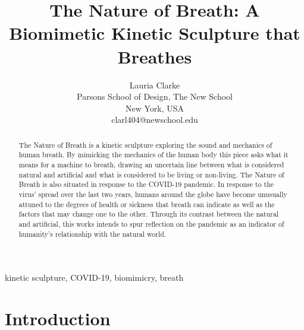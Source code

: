 \documentclass[letterpaper]{article}
\title{The Nature of Breath: A Biomimetic Kinetic Sculpture that Breathes}
\author{Lauria Clarke\\ Parsons School of Design, The New School\\ New York, USA\\ clarl404@newschool.edu\\}
\begin{document}
 
\maketitle

\begin{abstract}
The Nature of Breath is a kinetic sculpture exploring the sound and mechanics of human breath. By mimicking the mechanics of the human body this piece asks what it means for a machine to breath, drawing an uncertain line between what is considered natural and artificial and what is considered to be living or non-living. The Nature of Breath is also situated in response to the COVID-19 pandemic. In response to the virus' spread over the last two years, humans around the globe have become unusually attuned to the degrees of health or sickness that breath can indicate as well as the factors that may change one to the other. Through its contrast between the natural and artificial, this works intends to spur reflection on the pandemic as an indicator of humanity's relationship with the natural world. 
\end{abstract}

kinetic sculpture, COVID-19, biomimicry, breath
\section{Introduction}
\end{document}
